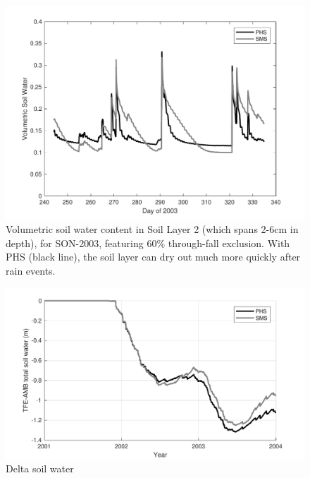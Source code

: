 \documentclass[draft,linenumbers]{agujournal}
\begin{document}
     \clearpage
    \begin{figure}[h]
     \centering
     \includegraphics[width=30pc]{../figs2/supplayer2.pdf}
     \caption{Volumetric soil water content in Soil Layer 2 (which spans 2-6cm in depth), for SON-2003, featuring 60\% through-fall exclusion.
     With PHS (black line), the soil layer can dry out much more quickly after rain events.}
     \label{supp:layer2}
  \end{figure}

        \clearpage
    \begin{figure}[h]
     \centering
     \includegraphics[width=30pc]{../figs2/suppsoilwater.pdf}
     \caption{Delta soil water}
     \label{supp:buff}
  \end{figure}
  
\end{document}
